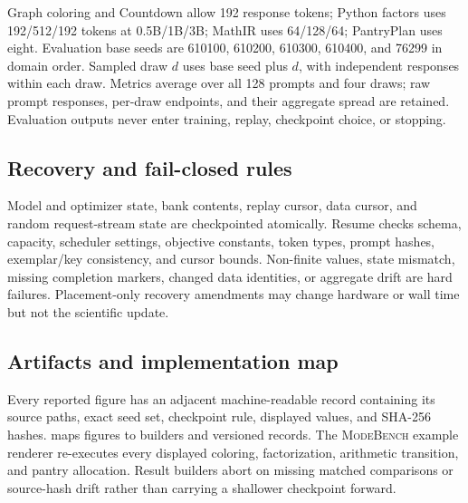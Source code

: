 \documentclass{article}
\newcommand{\1}{\mathbf 1}
\newcommand{\mb}{\textsc{ModeBench}}
\theoremstyle{remark}
\theoremstyle{definition}
\theoremstyle{plain}
\begin{document}
Graph coloring and Countdown allow 192 response tokens; Python factors uses
192/512/192 tokens at 0.5B/1B/3B; MathIR uses 64/128/64; PantryPlan uses eight.
Evaluation base seeds are 610100, 610200, 610300, 610400, and 76299 in domain
order. Sampled draw $d$ uses base seed plus $d$, with independent responses
within each draw. Metrics average over all 128 prompts and four draws; raw
prompt responses, per-draw endpoints, and their aggregate spread are retained.
Evaluation outputs never enter training, replay, checkpoint choice, or stopping.

\subsection{Recovery and fail-closed rules}
\label{app:repro-recovery}

Model and optimizer state, bank contents, replay cursor, data cursor, and random
request-stream state are checkpointed atomically. Resume checks schema,
capacity, scheduler settings, objective constants, token types, prompt hashes,
exemplar/key consistency, and cursor bounds. Non-finite values, state mismatch,
missing completion markers, changed data identities, or aggregate drift are
hard failures. Placement-only recovery amendments may change hardware or wall
time but not the scientific update.

\subsection{Artifacts and implementation map}
\label{app:repro-artifacts}
\label{app:repro-code}

Every reported figure has an adjacent machine-readable record containing its
source paths, exact seed set, checkpoint rule, displayed values, and SHA-256
hashes.  maps figures to builders and versioned
records. The \mb{} example renderer re-executes every displayed coloring,
factorization, arithmetic transition, and pantry allocation. Result builders
abort on missing matched comparisons or source-hash drift rather than carrying a
shallower checkpoint forward.
\end{document}
